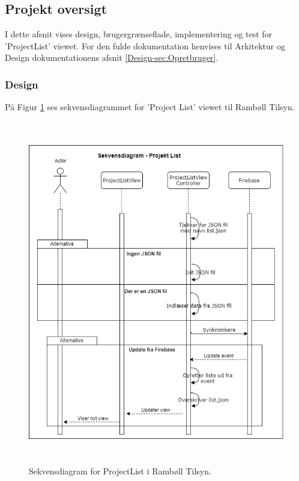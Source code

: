 \subsection{Projekt oversigt}
I dette afsnit vises design, brugergrænseflade, implementering og test for 'ProjectList' viewet. For den fulde dokumentation henvises til Arkitektur og Design dokumentationens afsnit \ref{Design-sec:Opretbruger}.

\subsubsection{Design}
På Figur \ref{fig:ProjctListSekvens} ses sekvensdiagrammet for 'Project List' viewet til Rambøll Tilsyn.
\begin{figure}[H] %
	\centering
	\includegraphics[height=15cm, width=12cm]{../ArkitekturDesign/Design/ProjectList/ProjektListSekvensDiagram}
	\caption{Sekvensdiagram for ProjectList i Rambøll Tilsyn.}
	\label{fig:ProjctListSekvens}
\end{figure}

\clearpage

